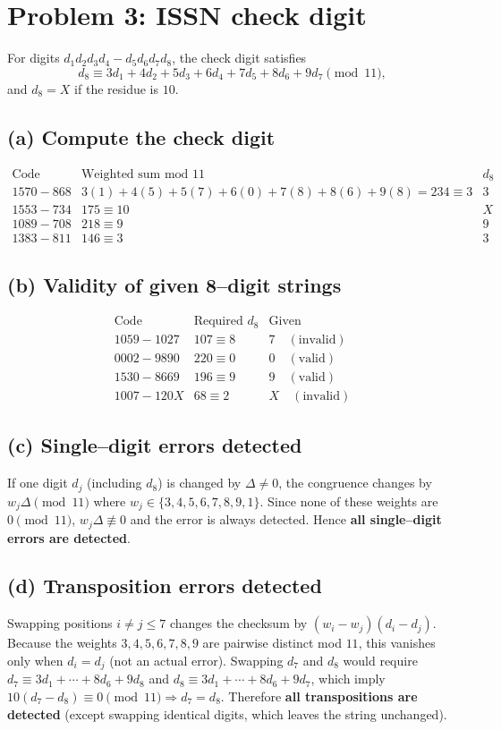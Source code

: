 \section*{Problem 3: ISSN check digit}

For digits \(d_1d_2d_3d_4\!-\!d_5d_6d_7d_8\), the check digit satisfies
\[
d_8 \equiv 3d_1+4d_2+5d_3+6d_4+7d_5+8d_6+9d_7 \pmod{11},
\]
and \(d_8=X\) if the residue is \(10\).

\subsection*{(a) Compute the check digit}
\[
\begin{array}{l|c|c}
\text{Code} & \text{Weighted sum mod }11 & d_8\\\hline
1570\!-\!868 & 3(1)+4(5)+5(7)+6(0)+7(8)+8(6)+9(8)=234\equiv 3 & 3\\
1553\!-\!734 & 175\equiv 10 & X\\
1089\!-\!708 & 218\equiv 9 & 9\\
1383\!-\!811 & 146\equiv 3 & 3
\end{array}
\]

\subsection*{(b) Validity of given 8–digit strings}
\[
\begin{array}{l|c|c}
\text{Code} & \text{Required } d_8 & \text{Given} \\\hline
1059\!-\!1027 & 107\equiv 8 & 7\quad(\text{invalid})\\
0002\!-\!9890 & 220\equiv 0 & 0\quad(\text{valid})\\
1530\!-\!8669 & 196\equiv 9 & 9\quad(\text{valid})\\
1007\!-\!120X & 68\equiv 2  & X\quad(\text{invalid})
\end{array}
\]

\subsection*{(c) Single–digit errors detected}
If one digit \(d_j\) (including \(d_8\)) is changed by \(\Delta\neq 0\), the congruence changes by
\(w_j\Delta \pmod{11}\) where \(w_j\in\{3,4,5,6,7,8,9,1\}\).
Since none of these weights are \(0\pmod{11}\), \(w_j\Delta\not\equiv 0\) and the error is always detected.
Hence \textbf{all single–digit errors are detected}.

\subsection*{(d) Transposition errors detected}
Swapping positions \(i\neq j\le 7\) changes the checksum by \((w_i-w_j)(d_i-d_j)\).
Because the weights \(3,4,5,6,7,8,9\) are pairwise distinct mod \(11\),
this vanishes only when \(d_i=d_j\) (not an actual error).
Swapping \(d_7\) and \(d_8\) would require
\(d_7 \equiv 3d_1+\cdots+8d_6+9d_8\) and
\(d_8 \equiv 3d_1+\cdots+8d_6+9d_7\),
which imply \(10(d_7-d_8)\equiv 0\!\!\pmod{11}\Rightarrow d_7=d_8\).
Therefore \textbf{all transpositions are detected} (except swapping identical digits, which leaves the string unchanged).
